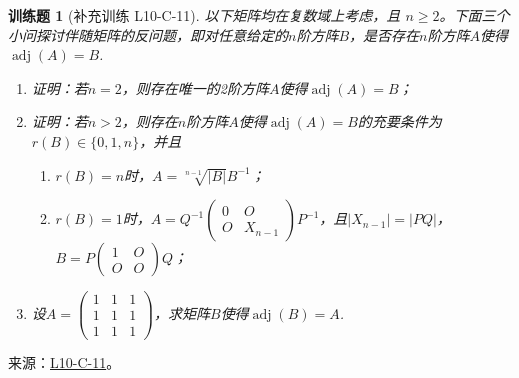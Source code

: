 \documentclass[UTF8,12pt,a4paper,fontset=fandol]{ctexart}
\newtheorem{exercise}{训练题}[section]
\begin{document}
\begin{exercise}[补充训练 L10-C-11]\label{prob:L10-C-11}
以下矩阵均在复数域上考虑，且 $n\ge2$。下面三个小问探讨伴随矩阵的反问题，即对任意给定的$n$阶方阵$B$，是否存在$n$阶方阵$A$使得$\operatorname{adj}(A)=B$.
        \begin{enumerate}
            \item 证明：若$n=2$，则存在唯一的2阶方阵$A$使得$\operatorname{adj}(A)=B$；

            \item 证明：若$n > 2$，则存在$n$阶方阵$A$使得$\operatorname{adj}(A)=B$的充要条件为$r(B) \in \{0,1,n\}$，并且
                  \begin{enumerate}
                      \item $r(B)=n$时，$A=\sqrt[n-1]{|B|}B^{-1}$；

                      \item $r(B)=1$时，$A=Q^{-1}\begin{pmatrix}
                                    0 & O \\ O & X_{n-1}
                                \end{pmatrix}P^{-1}$，且$|X_{n-1}|=|PQ|$，$B=P\begin{pmatrix}
                                    1 & O \\ O & O
                                \end{pmatrix}Q$；
                  \end{enumerate}

            \item 设$A=\begin{pmatrix}
                          1 & 1 & 1 \\ 1 & 1 & 1 \\ 1 & 1 & 1
                      \end{pmatrix}$，求矩阵$B$使得$\operatorname{adj}(B)=A$.
        \end{enumerate}
\end{exercise}
\noindent 来源：\href{https://github.com/yhwu-is/Linear-Algebra-Left-Undone/blob/new/%E8%AE%B2%E4%B9%89/%E4%B8%93%E9%A2%98/10%20%E8%A1%8C%E5%88%97%E5%BC%8F.tex}{L10-C-11}。
\end{document}
